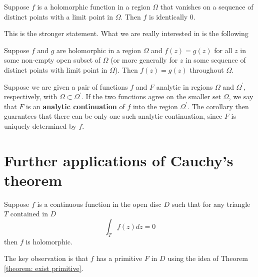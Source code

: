 \documentclass{chapter}
\begin{document}
            \begin{theorem}
                Suppose $f$ is a holomorphic function in a region $\Omega$ that vanishes on a sequence of distinct points with a limit point in $\Omega$. Then $f$ is identically $0$.
            \end{theorem}
            This is the stronger statement. What we are really interested in is the following
            \begin{corollary}
                Suppose $f$ and $g$ are holomorphic in a region $\Omega$ and $f(z)=g(z)$ for all $z$ in some non-empty open subset of $\Omega$ (or more generally for $z$ in some sequence of distinct points with limit point in $\Omega$). Then $f(z)=g(z)$ throughout $\Omega$.
            \end{corollary}
            Suppose we are given a pair of functions $f$ and $F$ analytic in regions $\Omega$ and $\Omega^{\prime},$ respectively, with $\Omega \subset \Omega^{\prime}$. If the two functions agree on the smaller set $\Omega$, we say that $F$ is an \textbf{analytic continuation} of $f$ into the region $\Omega^{\prime}$. The corollary then guarantees that there can be only one such analytic continuation, since $F$ is uniquely determined by $f$.

        \section{Further applications of Cauchy's theorem}
            \begin{theorem}
                Suppose $f$ is a continuous function in the open disc $D$ such that for any triangle $T$ contained in $D$ \[\int_{T} f(z) d z=0\] then $f$ is holomorphic.
            \end{theorem}
            \begin{remark}
                The key observation is that $f$ has a primitive $F$ in $D$ using the idea of Theorem \ref{theorem: exist primitive}.
            \end{remark}
    
\end{document}

